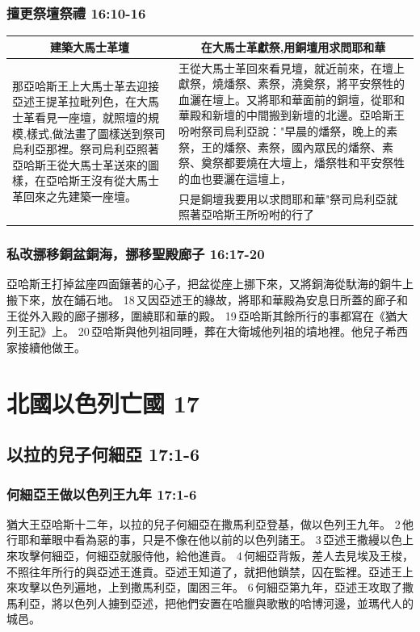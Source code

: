 \subsubsection{擅更祭壇祭禮 16:10-16}
\begin{table}[H]
\hspace{-5mm}
\centering
\begin{tabular}{p{6.1cm}|p{11.25cm}}\hline
\multicolumn{1}{c|}{建築大馬士革壇}&\multicolumn{1}{c}{在大馬士革獻祭,用銅壇用求問耶和華}\\\hline
\multirow{2}{6.2cm}{那亞哈斯王上大馬士革去迎接亞述王提革拉毗列色，在大馬士革看見一座壇，就照壇的規模,樣式,做法畫了圖樣送到祭司烏利亞那裡。祭司烏利亞照著亞哈斯王從大馬士革送來的圖樣，在亞哈斯王沒有從大馬士革回來之先建築一座壇。}
&王從大馬士革回來看見壇，就近前來，在壇上獻祭，燒燔祭、素祭，澆奠祭，將平安祭牲的血灑在壇上。又將耶和華面前的銅壇，從耶和華殿和新壇的中間搬到新壇的北邊。亞哈斯王吩咐祭司烏利亞說："早晨的燔祭，晚上的素祭，王的燔祭、素祭，國內眾民的燔祭、素祭、奠祭都要燒在大壇上，燔祭牲和平安祭牲的血也要灑在這壇上，\\\cline{2-2}
&只是銅壇我要用以求問耶和華"祭司烏利亞就照著亞哈斯王所吩咐的行了\\\hline
\end{tabular}
\end{table}



\subsubsection{私改挪移銅盆銅海，挪移聖殿廊子 16:17-20}
亞哈斯王打掉盆座四面鑲著的心子，把盆從座上挪下來，又將銅海從馱海的銅牛上搬下來，放在鋪石地。 18 又因亞述王的緣故，將耶和華殿為安息日所蓋的廊子和王從外入殿的廊子挪移，圍繞耶和華的殿。 19 亞哈斯其餘所行的事都寫在《猶大列王記》上。 20 亞哈斯與他列祖同睡，葬在大衛城他列祖的墳地裡。他兒子希西家接續他做王。


\section{北國以色列亡國 17 }
\subsection{以拉的兒子何細亞 17:1-6}
\subsubsection{何細亞王做以色列王九年 17:1-6}
猶大王亞哈斯十二年，以拉的兒子何細亞在撒馬利亞登基，做以色列王九年。 2 他行耶和華眼中看為惡的事，只是不像在他以前的以色列諸王。 3 亞述王撒縵以色上來攻擊何細亞，何細亞就服侍他，給他進貢。 4 何細亞背叛，差人去見埃及王梭，不照往年所行的與亞述王進貢。亞述王知道了，就把他鎖禁，囚在監裡。亞述王上來攻擊以色列遍地，上到撒馬利亞，圍困三年。 6 何細亞第九年，亞述王攻取了撒馬利亞，將以色列人擄到亞述，把他們安置在哈臘與歌散的哈博河邊，並瑪代人的城邑。


